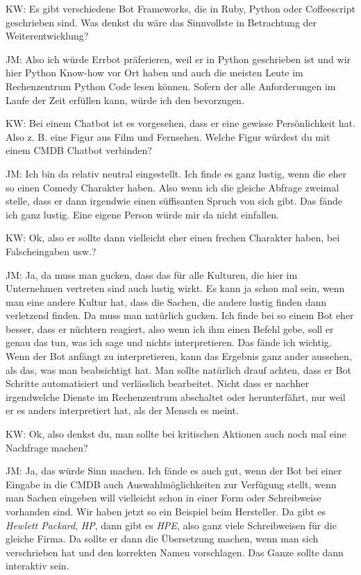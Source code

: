 \begin{list}{X:}{\setlength{\labelsep}{5mm}}
\item[KW:] Es gibt verschiedene Bot Frameworks, die in Ruby, Python oder Coffeescript geschrieben sind. Was denkst du wäre das Sinnvollste in Betrachtung der Weiterentwicklung?
\item[JM:] Also ich würde Errbot präferieren, weil er in Python geschrieben ist und wir hier Python Know-how vor Ort haben und auch die meisten Leute im Rechenzentrum Python Code lesen können. Sofern der alle Anforderungen im Laufe der Zeit erfüllen kann, würde ich den bevorzugen.
\item[KW:] Bei einem Chatbot ist es vorgesehen, dass er eine gewisse Persönlichkeit hat. Also z. B. eine  Figur aus Film und Fernsehen. Welche Figur würdest du mit einem CMDB Chatbot verbinden?
\item[JM:] Ich bin da relativ neutral eingestellt. Ich finde es ganz lustig, wenn die eher so einen Comedy Charakter haben. Also wenn ich die gleiche Abfrage zweimal stelle, dass er dann irgendwie einen süffisanten Spruch von sich gibt. Das fände ich ganz lustig. Eine eigene Person würde mir da nicht einfallen.
\item[KW:] Ok, also er sollte dann vielleicht eher einen frechen Charakter haben, bei Falscheingaben usw.?
\item[JM:] Ja, da muss man gucken, dass das für alle Kulturen, die hier im Unternehmen vertreten sind auch lustig wirkt. Es kann ja schon mal sein, wenn man eine andere Kultur hat, dass die Sachen, die andere lustig finden dann verletzend finden. Da muss man natürlich gucken. Ich finde bei so einem Bot eher besser, dass er nüchtern reagiert, also wenn ich ihm einen Befehl gebe, soll er genau das tun, was ich sage und nichts interpretieren. Das fände ich wichtig. Wenn der Bot anfängt zu interpretieren, kann das Ergebnis ganz ander aussehen, als das, was man beabsichtigt hat. Man sollte natürlich drauf achten, dass er Bot Schritte automatisiert und verlässlich bearbeitet. Nicht dass er nachher irgendwelche Dienste im Rechenzentrum abschaltet oder herunterfährt, nur weil er es anders interpretiert hat, als der Mensch es meint.
\item[KW:] Ok, also denkst du, man sollte bei kritischen Aktionen auch noch mal eine Nachfrage machen?
\item[JM:] Ja, das würde Sinn machen. Ich fände es auch gut, wenn der Bot bei einer Eingabe in die CMDB auch Auswahlmöglichkeiten zur Verfügung stellt, wenn man Sachen eingeben will vielleicht schon in einer Form oder Schreibweise vorhanden sind. Wir haben jetzt so ein Beispiel beim Hersteller. Da gibt es \textit{Hewlett Packard}, \textit{HP}, dann gibt es \textit{HPE}, also ganz viele Schreibweisen für die gleiche Firma. Da sollte er dann die Übersetzung machen, wenn man sich verschrieben hat und den korrekten Namen vorschlagen. Das Ganze sollte dann interaktiv sein.

\end{list}
